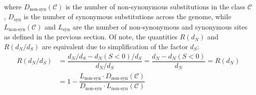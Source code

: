 \documentclass{article}
\newcommand{\dn}{d_N}
\newcommand{\ds}{d_S}
\newcommand{\dnds}{\dn / \ds}
\newcommand{\Sphy}{S}
\newcommand{\Sphyclass}{\mathcal{C}}
\begin{document}
    where $D_{\textrm{non-syn}} \left( \Sphyclass \right) $ is the number of non-synonymous substitutions in the class $\Sphyclass$, $D_{\textrm{syn}}$ is the number of synonymous substitutions across the genome, while $L_{\textrm{non-syn}} \left( \Sphyclass \right)$ and $L_{\textrm{syn}}$ are the number of non-synonymous and synonymous sites as defined in the previous section.
    Of note, the quantities $R(\dn)$ and $R(\dnds)$ are equivalent due to simplification of the factor $\ds$:
    \begin{align}
        R(\dnds) &= \dfrac{\dnds - \dn(\Sphy < 0) / \ds}{\dnds} = \dfrac{\dn - \dn(\Sphy < 0)}{\dn} = R(\dn) \\
        &= 1 - \dfrac{ L_{\textrm{non-syn}} \cdot D_{\textrm{non-syn}}\left( \Sphyclass \right) }{ D_{\textrm{non-syn}} \cdot L_{\textrm{non-syn}} \left( \Sphyclass \right)}
    \end{align}

    \printbibliography
\end{document}
